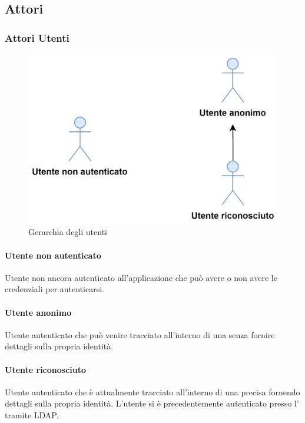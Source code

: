 \subsection{Attori}
\subsubsection{Attori Utenti}

\begin{figure}[h]
  \caption{Gerarchia degli utenti}
  \centering
    \includegraphics[scale=0.8]{Sezioni/UseCase/Immagini/Utenti.png}
\end{figure}

\paragraph{Utente non autenticato}
Utente non ancora autenticato all'applicazione che può avere o non avere le credenziali per autenticarsi.
\paragraph{Utente anonimo}
Utente autenticato che può venire tracciato all'interno di una  senza fornire dettagli sulla propria identità.
\paragraph{Utente riconosciuto}
Utente autenticato che è attualmente tracciato all'interno di una precisa  fornendo dettagli sulla propria identità.
L'utente si è precedentemente autenticato presso l' tramite LDAP.



